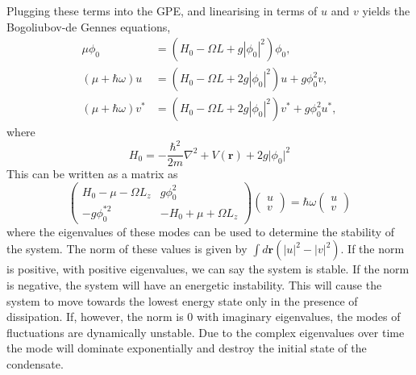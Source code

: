 Plugging these terms into the GPE, and linearising in terms of $u$ and $v$ yields the Bogoliubov-de Gennes equations,
\begin{subequations}\label{eqn:bogo_lhsrhs}
\begin{align}
    \mu \phi_0 &= (H_0 - \Omega L + g |\phi_0|^2)\phi_0,\\
    (\mu +\hbar\omega)u &= (H_0 - \Omega L + 2g|\phi_0|^2)u + g\phi_0^2 v,\\
    (\mu +\hbar\omega)v^{*} &= (H_0 - \Omega L + 2g|\phi_0|^2)v^{*} + g\phi_0^2 u^{*},
\end{align}
\end{subequations}
where
\begin{equation}\label{eqn:bogo_h0}
H_0 = -\frac{\hbar^2}{2m}\nabla^2 + V(\mathbf{r}) + 2g\vert \phi_0 \vert^2
\end{equation}
This can be written as a matrix as
\begin{equation}
    \begin{pmatrix}
        H_0 - \mu -\Omega L_z & g\phi_0^2 \\
        -g\phi_0^{*2} & -H_0 + \mu +\Omega L_z
    \end{pmatrix}
    \begin{pmatrix}
        u \\
        v
    \end{pmatrix}
    = \hbar\omega
    \begin{pmatrix}
        u \\
        v
    \end{pmatrix}
\end{equation}
where the eigenvalues of these modes can be used to determine the stability of the system. The norm of these values is given by $\int d\mathbf{r}(|u|^2 - |v|^2)$. If the norm is positive, with positive eigenvalues, we can say the system is stable. If the norm is negative, the system will have an energetic instability. This will cause the system to move towards the lowest energy state only in the presence of dissipation. If, however, the norm is 0 with imaginary eigenvalues, the modes of fluctuations are dynamically unstable. Due to the complex eigenvalues over time the mode will dominate exponentially and destroy the initial state of the condensate. %

